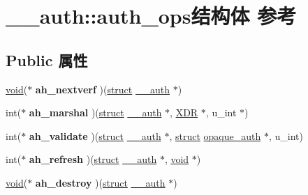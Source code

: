 \hypertarget{struct____auth_1_1auth__ops}{}\section{\+\_\+\+\_\+auth\+:\+:auth\+\_\+ops结构体 参考}
\label{struct____auth_1_1auth__ops}
\subsection*{Public 属性}
\begin{DoxyCompactItemize}
\item 
\mbox{\label{struct____auth_1_1auth__ops_a53e266321949ed712edbc9f1e783da6e}} 
\hyperlink{interfacevoid}{void}($\ast$ {\bfseries ah\+\_\+nextverf} )(\hyperlink{interfacestruct}{struct} \hyperlink{struct____auth}{\+\_\+\+\_\+auth} $\ast$)
\item 
\mbox{\label{struct____auth_1_1auth__ops_aa9319e60bd00b129488bf80ed8bf85de}} 
int($\ast$ {\bfseries ah\+\_\+marshal} )(\hyperlink{interfacestruct}{struct} \hyperlink{struct____auth}{\+\_\+\+\_\+auth} $\ast$, \hyperlink{struct____rpc__xdr}{X\+DR} $\ast$, u\+\_\+int $\ast$)
\item 
\mbox{\label{struct____auth_1_1auth__ops_afedeb18fa81a40713ec67d276376a1ac}} 
int($\ast$ {\bfseries ah\+\_\+validate} )(\hyperlink{interfacestruct}{struct} \hyperlink{struct____auth}{\+\_\+\+\_\+auth} $\ast$, \hyperlink{interfacestruct}{struct} \hyperlink{structopaque__auth}{opaque\+\_\+auth} $\ast$, u\+\_\+int)
\item 
\mbox{\label{struct____auth_1_1auth__ops_a387bc6ee7bdd44f0797bcf56c62e36d9}} 
int($\ast$ {\bfseries ah\+\_\+refresh} )(\hyperlink{interfacestruct}{struct} \hyperlink{struct____auth}{\+\_\+\+\_\+auth} $\ast$, \hyperlink{interfacevoid}{void} $\ast$)
\item 
\mbox{\label{struct____auth_1_1auth__ops_a0b00e5f09dad609bdae0a1300e816720}} 
\hyperlink{interfacevoid}{void}($\ast$ {\bfseries ah\+\_\+destroy} )(\hyperlink{interfacestruct}{struct} \hyperlink{struct____auth}{\+\_\+\+\_\+auth} $\ast$)
\item 
\mbox{\label{struct____auth_1_1auth__ops_ac853af72ccc8816b698a322807fa2324}} 

\end{DoxyCompactItemize}
